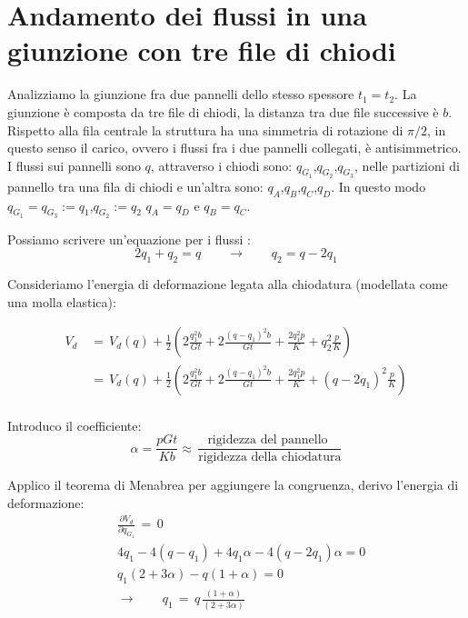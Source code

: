 \section{Andamento dei flussi in una giunzione con tre file di chiodi}

Analizziamo la giunzione fra due pannelli dello stesso spessore $t_1=t_2$. La giunzione è composta da tre file di chiodi, la distanza tra due file successive è $b$. Rispetto alla fila centrale la struttura ha una simmetria di rotazione di $\pi/2$, in questo senso il carico, ovvero i flussi fra i due pannelli collegati, è antisimmetrico.\\
I flussi sui pannelli sono $q$, attraverso i chiodi sono: $q_{G_1}$,$q_{G_2}$,$q_{G_3}$, nelle partizioni di pannello tra una fila di chiodi e un'altra sono: $q_A$,$q_B$,$q_C$,$q_D$. In questo modo $q_{G_1}=q_{G_3}:=q_1$,$q_{G_2}:=q_2$ $q_A=q_D$ e $q_B=q_C$.

Possiamo scrivere un'equazione per i flussi :
\begin{equation*}
    2q_1+q_2=q   \qquad\rightarrow\qquad q_2=q-2q_1
\end{equation*}

Consideriamo l'energia di deformazione legata alla chiodatura (modellata come una molla elastica):

\begin{align*}
    V_{d}\,&=\,V_d(q) +\frac{1}{2} \left( 2\frac{q_1^2b}{Gt}  + 2\frac{(q-q_1)^2b}{Gt} + \frac{2q_1^2p}{K} + q_2^2\frac{p}{K}   \right)\\
    &=\,V_d(q) +\frac{1}{2} \left( 2\frac{q_1^2b}{Gt}  + 2\frac{(q-q_1)^2b}{Gt} + \frac{2q_1^2p}{K} + (q-2q_1)^2\frac{p}{K}   \right)\\
\end{align*}

Introduco il coefficiente:
\begin{equation*}
 \alpha=\frac{pGt}{Kb}\approx\,\frac{\text{rigidezza del pannello }}{\text{rigidezza della chiodatura}}
\end{equation*}

Applico il teorema di Menabrea per aggiungere la congruenza, derivo l'energia di deformazione:
\begin{align*}
     &\frac{\partial V_d}{\partial q_{G_1}}\,=\,0  \\
     &4q_1-4(q-q_1)+4q_1\alpha -4(q-2q_1)\alpha=0                                     \\
      &         q_1(2+3\alpha)-q(1+\alpha)  =0                           \\      
   &\rightarrow\qquad q_1\,=\,q\,\frac{(1+\alpha)}{(2+3\alpha)}  
\end{align*}

